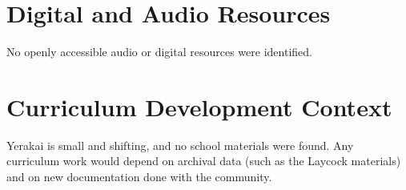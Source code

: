 \documentclass[12pt]{article}
\begin{document}
\section{Digital and Audio Resources}
No openly accessible audio or digital resources were identified.

\section{Curriculum Development Context}
Yerakai is small and shifting, and no school materials were found. Any curriculum work would depend on archival data (such as the Laycock materials) and on new documentation done with the community.
\end{document}
